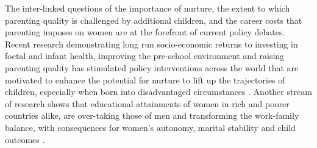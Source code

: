 \documentclass[11pt]{article}
\begin{document}
The inter-linked questions of the importance of nurture, the extent to which parenting quality is challenged by additional children, and the career costs that parenting imposes on women are at the forefront of current policy debates. Recent research demonstrating long run socio-economic returns to investing in foetal and infant health, improving the pre-school environment and raising parenting quality has stimulated policy interventions across the world that are motivated to enhance the potential for nurture to lift up the trajectories of children, especially when born into disadvantaged circumstances \cite{Heckmanetal2010,AlmondCurrie2011,Carneiroetal2015}. Another stream of research shows that educational attainments of women in rich and poorer countries alike, are over-taking those of men and transforming the work-family balance, with consequences for women's autonomy, marital stability and child outcomes \cite{Rendall2010,NewmanOlivetti2016,Lundbergetal2016}. 

\end{document}

